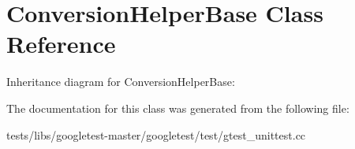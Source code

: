 \hypertarget{classConversionHelperBase}{}\section{Conversion\+Helper\+Base Class Reference}
\label{classConversionHelperBase}


Inheritance diagram for Conversion\+Helper\+Base\+:


The documentation for this class was generated from the following file\+:\begin{DoxyCompactItemize}
\item 
tests/libs/googletest-\/master/googletest/test/gtest\+\_\+unittest.\+cc\end{DoxyCompactItemize}
